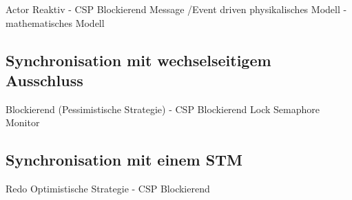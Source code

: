 


Actor Reaktiv - CSP Blockierend
Message /Event driven
physikalisches Modell - mathematisches Modell


\subsection{Synchronisation mit wechselseitigem Ausschluss}
Blockierend (Pessimistische Strategie) - CSP Blockierend
Lock
Semaphore
Monitor

\subsection{Synchronisation mit einem \acs{STM}}
Redo Optimistische Strategie - CSP Blockierend

